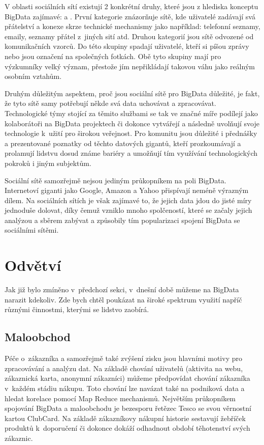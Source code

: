 V oblasti sociálních sítí existují 2 konkrétní druhy, které jsou z hlediska konceptu BigData zajímavé:  a . První kategorie znázorňuje sítě, kde uživatelé zadávají svá přátelství a konexe skrze technické mechanismy jako například: telefonní seznamy, emaily, seznamy přátel z~jiných sití atd. Druhou kategorií jsou sítě odvozené od komunikačních vzorců. Do této skupiny spadají uživatelé, kteří si píšou zprávy nebo jsou označení na společných fotkách. Obě tyto skupiny mají pro výzkumníky velký význam, přestože jím nepřikládají takovou váhu jako reálným osobním vztahům. \cite{social} 

Druhým důležitým aspektem, proč jsou sociální sítě pro BigData důležité, je fakt, že tyto sítě samy potřebují někde svá data uchovávat a zpracovávat. Technologické týmy stojící za těmito službami se tak ve značné míře podílejí jako kolaborátoři na BigData projektech či dokonce vytvářejí a následně uvolňují svoje technologie k~užití pro širokou veřejnost. Pro komunitu jsou důležité i přednášky a prezentované poznatky od těchto datových gigantů, kteří prozkoumávají a prolamují lidstvu dosud známe bariéry a umožňují tím využívání technologických pokroků i jiným subjektům. 

Sociální sítě samozřejmě nejsou jediným průkopníkem na poli BigData. Internetoví giganti jako Google, Amazon a Yahoo přispívají neméně výrazným dílem. Na sociálních sítích je však zajímavé to, že jejich data jdou do jisté míry jednoduše dolovat, díky čemuž vzniklo mnoho spolčeností, které se začaly jejich analýzou a sběrem zabývat a způsobily tím popularizaci spojení BigData se sociálními sítěmi. 


\section{Odvětví}

Jak již bylo zmíněno v~předchozí sekci, v~dnešní době můžeme na BigData narazit kdekoliv. Zde bych chtěl poukázat na široké spektrum využití napříč různými činnostmi, kterými se lidstvo zaobírá.\cite{sektory}

\subsection{Maloobchod}
Péče o~zákazníka a samozřejmě také zvýšení zisku jsou hlavními motivy pro zpracovávání a analýzu dat. Na základě chování uživatelů (aktivita na webu, zákaznická karta, anonymní zákazníci) můžeme předpovídat chování zákazníka v~každém stádiu nákupu. Toto chování lze navázat také na podniková data a hledat korelace pomocí Map Reduce mechanismů. Největším průkopníkem spojování BigData a maloobchodu je bezesporu řetězec Tesco se svou věrnostní kartou ClubCard. Na základě zákazníkovy nákupní historie sestavují žebříček produktů k~doporučení či dokonce dokáží odhadnout období těhotenství svých zákaznic.\cite{tesco}

